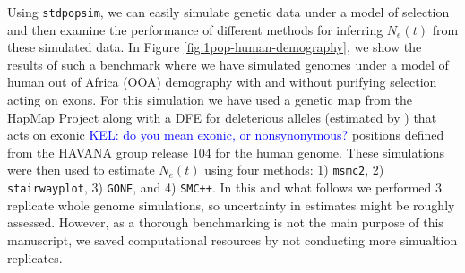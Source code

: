 \documentclass[hidelinks]{article}
\newcommand{\stdpopsim}{\texttt{stdpopsim}\xspace}
\newcommand{\msmc}{\texttt{msmc2}\xspace}
\newcommand{\stairway}{\texttt{stairwayplot}\xspace}
\newcommand{\gone}{\texttt{GONE}\xspace}
\newcommand{\smcpp}{\texttt{SMC++}\xspace}
\newcommand{\kelcomment}[1]{\textcolor{blue}{KEL: #1}}
\begin{document}
    Using \stdpopsim, we can easily simulate genetic data under a model of selection and then 
    examine the performance of different methods for inferring $N_e(t)$ from these simulated 
    data. In Figure \ref{fig:1pop-human-demography}, we show the results of such a benchmark
    where we have simulated genomes under a model of human out of Africa (OOA) demography
    with and without purifying selection acting on exons.
    For this simulation we have used
    a genetic map from the HapMap Project \citep{international2007second} along with a
    DFE for deleterious alleles (estimated by \cite{huber2017determining})
    that acts on exonic \kelcomment{do you mean exonic, or nonsynonymous?} positions defined from the HAVANA group release 104 for the human genome.
    These simulations were then used to estimate $N_e(t)$ using four methods: 1) \msmc \citep{Schiffels2020}, 
    2) \stairway \citep{liu2020stairway}, 3) \gone \citep{santiago2020recent}, and 4) \smcpp \citep{terhorst2017robust}.
    In this and what follows we performed 3 replicate whole genome simulations, so uncertainty in estimates might
    be roughly assessed.
    However, as a thorough benchmarking is not the main purpose of this manuscript, we saved computational resources by not conducting more simualtion replicates.
    
\end{document}
